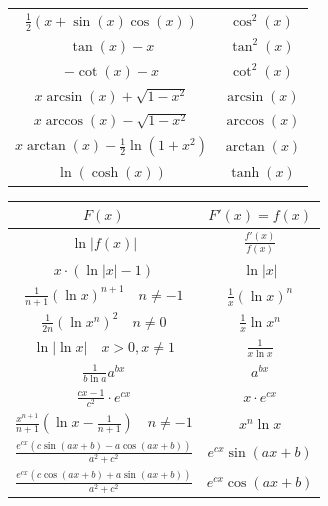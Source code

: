\documentclass[a4paper,8pt]{extarticle}
\begin{document}
\begin{center}
\begin{tabular}{c||c}
                $ \frac{1}{2} (x+\sin(x)\cos(x)) $  &  $ \cos^2(x) $ \\
                $ \tan(x)-x $  &  $ \tan^2(x) $ \\
                $ -\cot(x)-x $  &  $ \cot^2(x) $ \\
                $ x \arcsin(x) + \sqrt{1-x^2} $  &  $ \arcsin(x) $ \\
                $ x \arccos(x) - \sqrt{1-x^2} $  &  $ \arccos(x) $ \\
                $ x \arctan(x) - \frac{1}{2} \ln (1+x^2) $  &  $ \arctan(x) $ \\
                $ \ln(\cosh(x)) $  &  $ \tanh(x) $ \\
        \end{tabular}
\end{center}
    
    
\begin{center}
        \begin{tabular}{c||c}
                $F(x)$ & $F'(x) = f(x)$ \\
                \hline \hline
                
               
                $ \ln {| f(x) |} $   &   $ \frac{f'(x)}{f(x)} $ \\
                $ x \cdot (\ln |x| - 1) $  &  $ \ln |x| $ \\
                $ \frac{1}{n+1} (\ln x)^{n+1} \quad \scriptstyle  n \neq -1 $  &  $ \frac{1}{x}(\ln x)^n $ \\
                $ \frac{1}{2n} (\ln x^n)^{2} \quad \scriptstyle  n \neq 0 $  &  $ \frac{1}{x}\ln x^n $ \\
                $ \ln |\ln x| \quad \scriptstyle x>0,x\neq 1 $  &  $ \frac{1}{x \ln x} $ \\
                $ \frac{1}{b \ln a} a^{bx} $  &  $ a^{bx} $ \\
                $ \frac{cx-1}{c^2} \cdot e^{cx} $  &  $ x\cdot e^{cx} $ \\
                $ \frac{x^{n+1}}{n+1} \left( \ln x - \frac{1}{n+1} \right) \quad \scriptstyle  n \neq -1 $  &  $ x^n \ln x $ \\
                $ \frac{e^{cx} \left( c \sin (ax+b)-a \cos(ax+b) \right)}{a^2+c^2}  $  &  $ \scriptstyle e^{cx} \sin (ax+b)  $ \\
                $ \frac{e^{cx} \left( c \cos (ax+b)+a \sin(ax+b) \right)}{a^2+c^2}  $ &  $ \scriptstyle e^{cx} \cos (ax+b)  $ \\
        \end{tabular}
\end{center}
\end{document}
